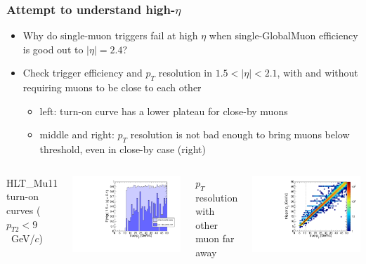\documentclass[compress]{beamer}
\begin{document}
\begin{frame}
\frametitle{Attempt to understand high-$\eta$}
\begin{itemize}
\item Why do single-muon triggers fail at high $\eta$ when single-GlobalMuon efficiency is good out to $|\eta| = 2.4$?

\item Check trigger efficiency and $p_T$ resolution in $1.5 < |\eta| < 2.1$, with and without requiring muons to be close to each other
\begin{itemize}
\item left: turn-on curve has a lower plateau for close-by muons

\item middle and right: $p_T$ resolution is not bad enough to bring muons below threshold, even in close-by case (right)
\end{itemize}
\end{itemize}

\begin{columns}
\centering HLT\_Mu11 turn-on curves ($p_{T2} < 9$~GeV/$c$)

\includegraphics[width=\linewidth]{trigger_turnonMu11.pdf}

\centering $p_T$ resolution with other muon far away

\includegraphics[width=\linewidth]{trigger_resolution_faraway.pdf}


\end{columns}
\end{frame}
\end{document}
